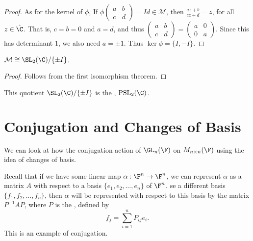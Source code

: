 \documentclass[a4]{scrreprt}
\begin{document}
\begin{proof}
	As for the kernel of $\phi$, If $\phi\begin{pmatrix}
		a & b \\ c & d
	\end{pmatrix} = Id \in \mathcal{M}$, then $\frac{az + b}{cz + d} = z$, for all $z \in \hat{\C}$. That is, $c = b = 0$ and $a = d$, and thus $\begin{pmatrix}
		a & b \\ c & d
	\end{pmatrix} = \begin{pmatrix}
		a & 0 \\ 0 & a
	\end{pmatrix}$. Since this has determinant 1, we also need $a = \pm  1$. Thus $\ker \phi = \{I, -I\}$.
\end{proof}

\begin{corollary}
	$\mathcal{M} \cong \SL_2(\C) / \{\pm I\}$.
\end{corollary}
\begin{proof}
	Follows from the first isomorphism theorem.
\end{proof}

This quotient $\SL_2(\C) / \{\pm I\}$ is the , $\operatorname{PSL}_2(\C)$.


\section{Conjugation and Changes of Basis}

We can look at how the conjugation action of $\GL_{n} (\F)$ on $M_{n \times n}(\F)$ using the idea of changes of basis.

Recall that if we have some linear map $\alpha : \F^n \rightarrow \F^n$, we can represent $\alpha$ as a matrix $A$ with respect to a basis $\{e_1, e_2, \dots, e_n\}$ of $\F^n$.
se a different basis $\{f_1, f_2, \dots, f_n\}$, then $\alpha$ will be represented with respect to this basis by the matrix $P^{-1} A P$, where $P$ is the , defined by
$$
	f_j = \sum_{i = 1}^n P_{ij} e_i.
$$
This is an example of conjugation.
\end{document}
